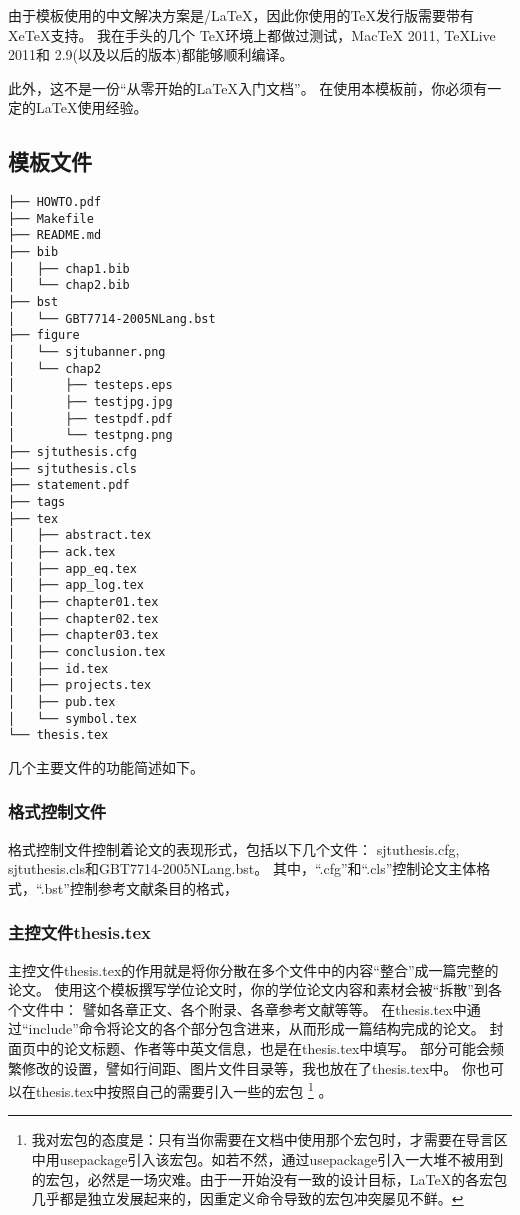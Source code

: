 由于模板使用的中文解决方案是{\XeTeX/\LaTeX}，因此你使用的TeX发行版需要带有XeTeX支持。 
我在手头的几个 \TeX 环境上都做过测试，MacTeX 2011, TeXLive 2011和{\CTeX} 2.9(以及以后的版本)都能够顺利编译。
 
此外，这不是一份“从零开始的{\LaTeX}入门文档”。
在使用本模板前，你必须有一定的{\LaTeX}使用经验。

\subsection{模板文件}
\label{sec:layout}

\begin{lstlisting}[basicstyle=\small\ttfamily,caption={模板文件布局},label=layout,float,numbers=none]
├── HOWTO.pdf
├── Makefile
├── README.md
├── bib
│   ├── chap1.bib
│   └── chap2.bib
├── bst
│   └── GBT7714-2005NLang.bst
├── figure
│   └── sjtubanner.png
│   └── chap2
│       ├── testeps.eps
│       ├── testjpg.jpg
│       ├── testpdf.pdf
│       └── testpng.png
├── sjtuthesis.cfg
├── sjtuthesis.cls
├── statement.pdf
├── tags
├── tex
│   ├── abstract.tex
│   ├── ack.tex
│   ├── app_eq.tex
│   ├── app_log.tex
│   ├── chapter01.tex
│   ├── chapter02.tex
│   ├── chapter03.tex
│   ├── conclusion.tex
│   ├── id.tex
│   ├── projects.tex
│   ├── pub.tex
│   └── symbol.tex
└── thesis.tex
\end{lstlisting}

几个主要文件的功能简述如下。

\subsubsection{格式控制文件}
\label{sec:format}

格式控制文件控制着论文的表现形式，包括以下几个文件：
sjtuthesis.cfg, sjtuthesis.cls和GBT7714-2005NLang.bst。
其中，``.cfg''和``.cls''控制论文主体格式，``.bst''控制参考文献条目的格式，

\subsubsection{主控文件thesis.tex}
\label{sec:thesistex}

主控文件thesis.tex的作用就是将你分散在多个文件中的内容``整合''成一篇完整的论文。
使用这个模板撰写学位论文时，你的学位论文内容和素材会被``拆散''到各个文件中：
譬如各章正文、各个附录、各章参考文献等等。
在thesis.tex中通过``include''命令将论文的各个部分包含进来，从而形成一篇结构完成的论文。
封面页中的论文标题、作者等中英文信息，也是在thesis.tex中填写。
部分可能会频繁修改的设置，譬如行间距、图片文件目录等，我也放在了thesis.tex中。
你也可以在thesis.tex中按照自己的需要引入一些的宏包
\footnote{我对宏包的态度是：只有当你需要在文档中使用那个宏包时，才需要在导言区中用usepackage引入该宏包。如若不然，通过usepackage引入一大堆不被用到的宏包，必然是一场灾难。由于一开始没有一致的设计目标，{\LaTeX}的各宏包几乎都是独立发展起来的，因重定义命令导致的宏包冲突屡见不鲜。}
。

